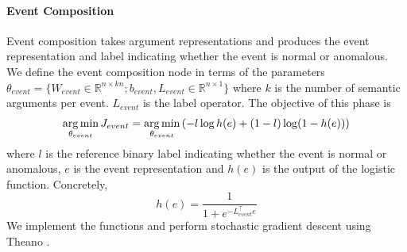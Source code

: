 \paragraph{Event Composition}
Event composition takes argument representations and produces the event
representation and label indicating whether the event is
normal or anomalous.  We define the event composition node in terms of the
parameters $\theta_{event} = \{W_{event} \in \mathbb{R}^{n \times kn}; b_{event},
L_{event} \in \mathbb{R}^{n \times 1}\}$
where $k$ is the number of semantic arguments per event.  $L_{event}$ is the
label operator.  The objective of this
phase is 
\begin{align*}
\begin{aligned}
\operatorname*{arg\,min}_{\theta_{event}} J_{event} = \operatorname*{arg\,min}_{\theta_{event}} \left( - l \log h(e) + (1-l) \log (1 - h(e)) \right)
\end{aligned}
\end{align*}
where $l$ is the reference binary label indicating whether the event is normal or
anomalous, $e$ is the event representation and
$h(e)$ is the output of the logistic function.  Concretely,
\begin{equation*}
 h(e) = \frac{1}{1+e^{-L_{event}^\intercal e}}
\end{equation*}
We implement the functions and perform stochastic gradient descent using Theano
\cite{bergstra2010theano}.
